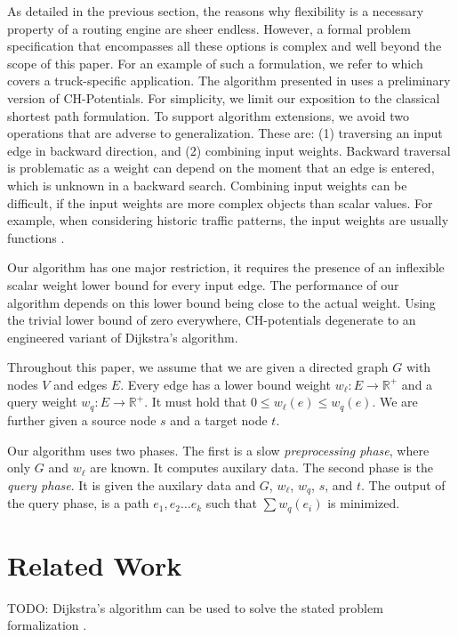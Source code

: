 \documentclass[a4paper,UKenglish,cleveref, autoref]{lipics-v2019}
\begin{document}
As detailed in the previous section, the reasons why flexibility is a necessary property of a routing engine are sheer endless.
However, a formal problem specification that encompasses all these options is complex and well beyond the scope of this paper.
For an example of such a formulation, we refer to \cite{kswz-erptd-20} which covers a truck-specific application.
The algorithm presented in \cite{kswz-erptd-20} uses a preliminary version of CH-Potentials.
For simplicity, we limit our exposition to the classical shortest path formulation.
To support algorithm extensions, we avoid two operations that are adverse to generalization.
These are:
(1) traversing an input edge in backward direction, and
(2) combining input weights.
Backward traversal is problematic as a weight can depend on the moment that an edge is entered, which is unknown in a backward search.
Combining input weights can be difficult, if the input weights are more complex objects than scalar values.
For example, when considering historic traffic patterns, the input weights are usually functions \cite{citation needed}.

Our algorithm has one major restriction, it requires the presence of an inflexible scalar weight lower bound for every input edge.
The performance of our algorithm depends on this lower bound being close to the actual weight.
Using the trivial lower bound of zero everywhere, CH-potentials degenerate to an engineered variant of Dijkstra's algorithm.

Throughout this paper, we assume that we are given a directed graph $G$ with nodes $V$ and edges $E$.
Every edge has a lower bound weight $w_\ell:E\rightarrow \mathbb{R}^+$ and a query weight $w_q:E\rightarrow \mathbb{R}^+$.
It must hold that $0\le w_\ell(e)\le w_q(e)$.
We are further given a source node $s$ and a target node $t$.

Our algorithm uses two phases.
The first is a slow \emph{preprocessing phase}, where only $G$ and $w_\ell$ are known.
It computes auxilary data.
The second phase is the \emph{query phase}.
It is given the auxilary data and $G$, $w_\ell$, $w_q$, $s$, and $t$.
The output of the query phase, is a path $e_1,e_2\ldots e_k$ such that $\sum w_q(e_i)$ is minimized.

\section{Related Work}

TODO: Dijkstra's algorithm \cite{d-ntpcg-59} can be used to solve the stated problem formalization \cite{Veit?}.
\end{document}

